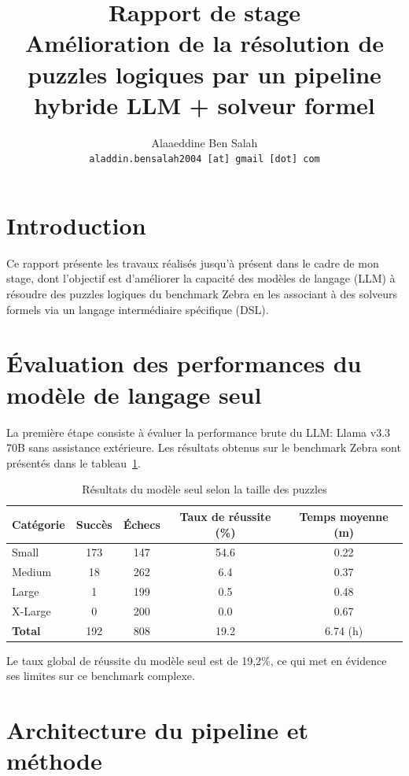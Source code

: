 \documentclass[a4paper,11pt]{article}
\title{Rapport de stage\\
\large Amélioration de la résolution de puzzles logiques par un pipeline hybride LLM + solveur formel}
\author{Alaaeddine Ben Salah \\ \texttt{aladdin.bensalah2004 [at] gmail [dot] com}}
\date{}
\begin{document}
\maketitle

\section{Introduction}
Ce rapport présente les travaux réalisés jusqu'à présent dans le cadre de mon stage, dont l'objectif est d'améliorer la capacité des modèles de langage (LLM) à résoudre des puzzles logiques du benchmark Zebra en les associant à des solveurs formels via un langage intermédiaire spécifique (DSL).

\section{Évaluation des performances du modèle de langage seul}

La première étape consiste à évaluer la performance brute du LLM: Llama v3.3 70B sans assistance extérieure. Les résultats obtenus sur le benchmark Zebra sont présentés dans le tableau~\ref{tab:results-model-only}.

\begin{table}[h!]
    \centering
    \caption{Résultats du modèle seul selon la taille des puzzles}
    \label{tab:results-model-only}
    \begin{tabular}{lcccc}
        \toprule
        Catégorie & Succès & Échecs & Taux de réussite (\%) & Temps moyenne (m) \\
        \midrule
        Small    & 173 & 147 & \num{54.6} & 0.22 \\
        Medium   & 18  & 262 & \num{6.4}  & 0.37 \\
        Large    & 1   & 199 & \num{0.5}  & 0.48 \\
        X-Large  & 0   & 200 & \num{0.0}  & 0.67 \\
        \midrule
        \textbf{Total}    & 192 & 808 & \num{19.2} & 6.74 (h) \\
        \bottomrule
    \end{tabular}
\end{table}

Le taux global de réussite du modèle seul est de 19,2\%, ce qui met en évidence ses limites sur ce benchmark complexe.

\section{Architecture du pipeline et méthode}
\end{document}
